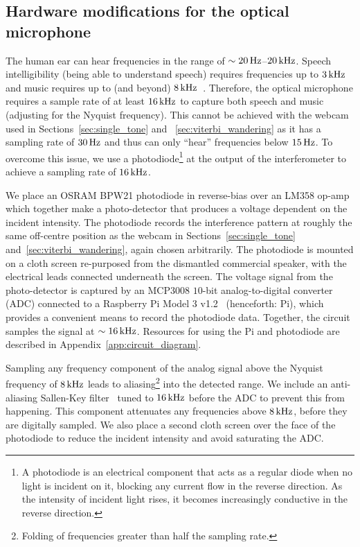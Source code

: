 \documentclass[paper-main.tex]{subfiles}
\begin{document}
\subsection{Hardware modifications for the optical microphone}
\label{sec:photodiode}


The human ear can hear frequencies in the range of $\sim 20\,{\rm Hz}$--$20\,{\rm kHz}$. Speech intelligibility (being able to understand speech) requires frequencies up to $3\,{\rm kHz}$ and music requires up to (and beyond) $8\,{\rm kHz}$~\cite{speech_intelligibility}. Therefore, the optical microphone requires a sample rate of at least $16\,{\rm kHz}$ to capture both speech and music (adjusting for the Nyquist frequency). This cannot be achieved with the webcam used in Sections~\ref{sec:single_tone} and ~\ref{sec:viterbi_wandering} as it has a sampling rate of $30\,{\rm Hz}$ and thus can only ``hear'' frequencies below $15\,{\rm Hz}$.
To overcome this issue, we use a photodiode\footnote{A photodiode is an electrical component that acts as a regular diode when no light is incident on it, blocking any current flow in the reverse direction. As the intensity of incident light rises, it becomes increasingly conductive in the reverse direction.} at the output of the interferometer to achieve a sampling rate of $16\,{\rm kHz}$.

We place an OSRAM BPW21 photodiode in reverse-bias over an LM358 op-amp which together make a photo-detector that produces a voltage dependent on the incident intensity. 
The photodiode records the interference pattern at roughly the same off-centre position as the webcam in Sections~\ref{sec:single_tone} and~\ref{sec:viterbi_wandering}, again chosen arbitrarily.
The photodiode is mounted on a cloth screen re-purposed from the dismantled commercial speaker, with the electrical leads connected underneath the screen. 
The voltage signal from the photo-detector is captured by an MCP3008 $10$-bit analog-to-digital converter (ADC) connected to a Raspberry Pi Model 3 v1.2~\cite{RaspberryPi:online} (henceforth: Pi), which provides a convenient means to record the photodiode data.
Together, the circuit samples the signal at $\sim 16\,{\rm kHz}$. Resources for using the Pi and photodiode are described in Appendix~\ref{app:circuit_diagram}.

Sampling any frequency component of the analog signal above the Nyquist frequency of $8\,{\rm kHz}$ leads to aliasing\footnote{Folding of frequencies greater than half the sampling rate.} into the detected range. We include an anti-aliasing Sallen-Key filter~\cite{sallen_key_filter} tuned to $16\,{\rm kHz}$ before the ADC to prevent this from happening.
This component attenuates any frequencies above $8\,{\rm kHz}$, before they are digitally sampled. We also place a second cloth screen over the face of the photodiode to reduce the incident intensity and avoid saturating the ADC.
\end{document}
